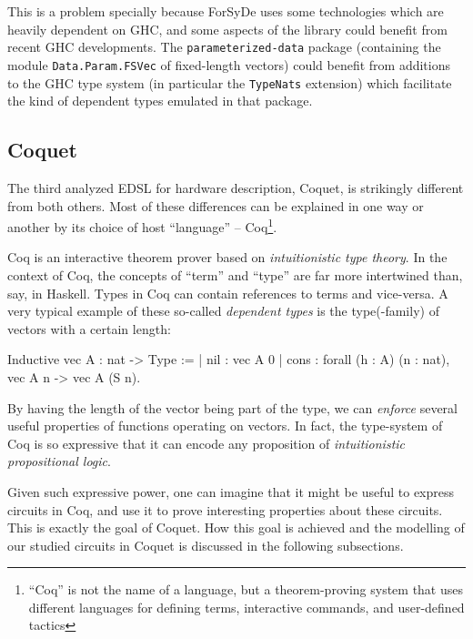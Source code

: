 \documentclass[a4paper]{article}
\begin{document}
                This is a problem specially because ForSyDe uses some technologies which are heavily
                dependent on GHC, and some aspects of the library could benefit from recent GHC
                developments. The \texttt{parameterized-data} package (containing the module
                \texttt{Data.Param.FSVec} of fixed-length vectors) could benefit from additions to
                the GHC type system (in particular the \texttt{TypeNats}\cite{website:ghc-typenats}
                extension) which facilitate the kind of dependent types emulated in that package.


        \subsection{Coquet}
        \label{subsec:coquet}
            The third analyzed EDSL for hardware description, Coquet\cite{coquet2011},
            is strikingly different from both others. Most of these differences can be explained in
            one way or another by its choice of host ``language'' -- Coq\footnote{``Coq'' is not
                the name of a language, but a theorem-proving system that uses different languages
                for defining terms, interactive commands, and user-defined tactics}.

            Coq is an interactive theorem prover based on \emph{intuitionistic type theory}. In the
            context of Coq, the concepts of ``term'' and ``type'' are far more intertwined than,
            say, in Haskell. Types in Coq can contain references to terms and vice-versa. A very
            typical example of these so-called \emph{dependent types} is the type(-family) of
            vectors with a certain length:
            \begin{coqcode}
        Inductive vec A : nat -> Type :=
            | nil  : vec A 0
            | cons : forall (h : A) (n : nat),  vec A n -> vec A (S n).
            \end{coqcode}

            By having the length of the vector being part of the type, we can \emph{enforce} several
            useful properties of functions operating on vectors. In fact, the type-system of Coq is
            so expressive that it can encode any proposition of \emph{intuitionistic propositional
                logic}.

            Given such expressive power, one can imagine that it might be useful to express circuits
            in Coq, and use it to prove interesting properties about these circuits. This is exactly
            the goal of Coquet. How this goal is achieved and the modelling of our studied circuits
            in Coquet is discussed in the following subsections.
\end{document}
